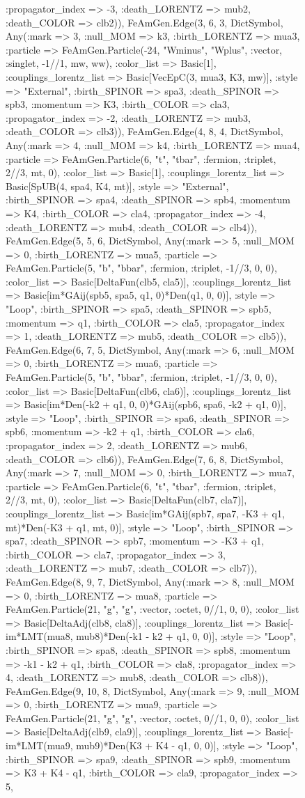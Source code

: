 \documentclass{revtex4}
\begin{document}
\begin{figure}[!htb]
\begin{center}
{:propagator_index => -3, :death_LORENTZ => mub2, :death_COLOR => clb2)), FeAmGen.Edge(3, 6, 3, Dict{Symbol, Any}(:mark => 3, :null_MOM => k3, :birth_LORENTZ => mua3, :particle => FeAmGen.Particle(-24, "Wminus", "Wplus", :vector, :singlet, -1//1, mw, ww), :color_list => Basic[1], :couplings_lorentz_list => Basic[VecEpC(3, mua3, K3, mw)], :style => "External", :birth_SPINOR => spa3, :death_SPINOR => spb3, :momentum => K3, :birth_COLOR => cla3, :propagator_index => -2, :death_LORENTZ => mub3, :death_COLOR => clb3)), FeAmGen.Edge(4, 8, 4, Dict{Symbol, Any}(:mark => 4, :null_MOM => k4, :birth_LORENTZ => mua4, :particle => FeAmGen.Particle(6, "t", "tbar", :fermion, :triplet, 2//3, mt, 0), :color_list => Basic[1], :couplings_lorentz_list => Basic[SpUB(4, spa4, K4, mt)], :style => "External", :birth_SPINOR => spa4, :death_SPINOR => spb4, :momentum => K4, :birth_COLOR => cla4, :propagator_index => -4, :death_LORENTZ => mub4, :death_COLOR => clb4)), FeAmGen.Edge(5, 5, 6, Dict{Symbol, Any}(:mark => 5, :null_MOM => 0, :birth_LORENTZ => mua5, :particle => FeAmGen.Particle(5, "b", "bbar", :fermion, :triplet, -1//3, 0, 0), :color_list => Basic[DeltaFun(clb5, cla5)], :couplings_lorentz_list => Basic[im*GAij(spb5, spa5, q1, 0)*Den(q1, 0, 0)], :style => "Loop", :birth_SPINOR => spa5, :death_SPINOR => spb5, :momentum => q1, :birth_COLOR => cla5, :propagator_index => 1, :death_LORENTZ => mub5, :death_COLOR => clb5)), FeAmGen.Edge(6, 7, 5, Dict{Symbol, Any}(:mark => 6, :null_MOM => 0, :birth_LORENTZ => mua6, :particle => FeAmGen.Particle(5, "b", "bbar", :fermion, :triplet, -1//3, 0, 0), :color_list => Basic[DeltaFun(clb6, cla6)], :couplings_lorentz_list => Basic[im*Den(-k2 + q1, 0, 0)*GAij(spb6, spa6, -k2 + q1, 0)], :style => "Loop", :birth_SPINOR => spa6, :death_SPINOR => spb6, :momentum => -k2 + q1, :birth_COLOR => cla6, :propagator_index => 2, :death_LORENTZ => mub6, :death_COLOR => clb6)), FeAmGen.Edge(7, 6, 8, Dict{Symbol, Any}(:mark => 7, :null_MOM => 0, :birth_LORENTZ => mua7, :particle => FeAmGen.Particle(6, "t", "tbar", :fermion, :triplet, 2//3, mt, 0), :color_list => Basic[DeltaFun(clb7, cla7)], :couplings_lorentz_list => Basic[im*GAij(spb7, spa7, -K3 + q1, mt)*Den(-K3 + q1, mt, 0)], :style => "Loop", :birth_SPINOR => spa7, :death_SPINOR => spb7, :momentum => -K3 + q1, :birth_COLOR => cla7, :propagator_index => 3, :death_LORENTZ => mub7, :death_COLOR => clb7)), FeAmGen.Edge(8, 9, 7, Dict{Symbol, Any}(:mark => 8, :null_MOM => 0, :birth_LORENTZ => mua8, :particle => FeAmGen.Particle(21, "g", "g", :vector, :octet, 0//1, 0, 0), :color_list => Basic[DeltaAdj(clb8, cla8)], :couplings_lorentz_list => Basic[-im*LMT(mua8, mub8)*Den(-k1 - k2 + q1, 0, 0)], :style => "Loop", :birth_SPINOR => spa8, :death_SPINOR => spb8, :momentum => -k1 - k2 + q1, :birth_COLOR => cla8, :propagator_index => 4, :death_LORENTZ => mub8, :death_COLOR => clb8)), FeAmGen.Edge(9, 10, 8, Dict{Symbol, Any}(:mark => 9, :null_MOM => 0, :birth_LORENTZ => mua9, :particle => FeAmGen.Particle(21, "g", "g", :vector, :octet, 0//1, 0, 0), :color_list => Basic[DeltaAdj(clb9, cla9)], :couplings_lorentz_list => Basic[-im*LMT(mua9, mub9)*Den(K3 + K4 - q1, 0, 0)], :style => "Loop", :birth_SPINOR => spa9, :death_SPINOR => spb9, :momentum => K3 + K4 - q1, :birth_COLOR => cla9, :propagator_index => 5, }
\end{center}
\end{figure}
\end{document}
